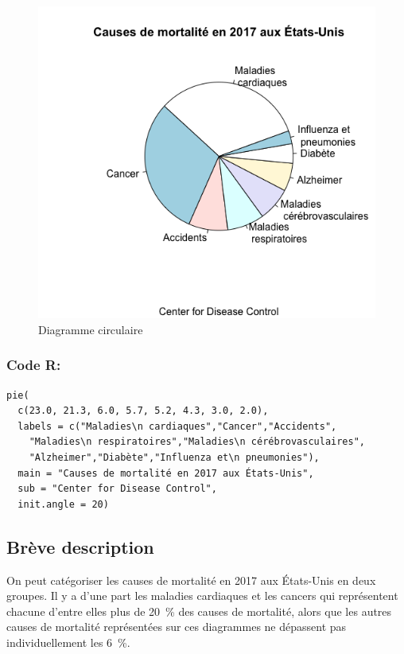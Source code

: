 \documentclass[10pt,twocolumn]{article}
\begin{document}
\begin{figure}[htbp]
	\caption{Diagramme circulaire}
	\label{mortalitePie}
	\centering
	\includegraphics[width=\linewidth]{d1_mortalitePie}
\end{figure}

\subsubsection*{Code R:}
\begin{verbatim}
pie(
  c(23.0, 21.3, 6.0, 5.7, 5.2, 4.3, 3.0, 2.0),
  labels = c("Maladies\n cardiaques","Cancer","Accidents",
    "Maladies\n respiratoires","Maladies\n cérébrovasculaires",
    "Alzheimer","Diabète","Influenza et\n pneumonies"),
  main = "Causes de mortalité en 2017 aux États-Unis",
  sub = "Center for Disease Control",
  init.angle = 20)
\end{verbatim}


\subsection{Brève description}
On peut catégoriser les causes de mortalité en 2017 aux États-Unis en deux groupes. Il y a d’une part les maladies cardiaques et les cancers qui représentent chacune d’entre elles plus de 20~\% des causes de mortalité, alors que les autres causes de mortalité représentées sur ces diagrammes ne dépassent pas individuellement les 6~\%.
\end{document}
